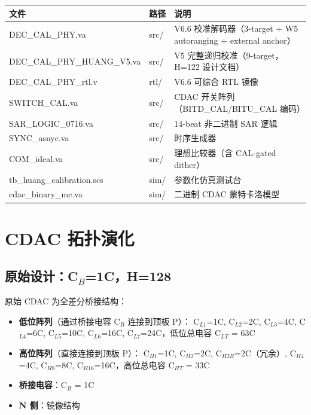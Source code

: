 \documentclass[UTF8,a4paper,12pt]{ctexart}
\theoremstyle{definition}
\begin{document}
\begin{longtable}{p{4.5cm}p{3cm}p{7cm}}
\toprule
\textbf{文件} & \textbf{路径} & \textbf{说明} \\
\midrule
\endhead
\bottomrule
\endfoot
DEC\_CAL\_PHY.va & src/ & V6.6 校准解码器（3-target + W5 autoranging + external anchor） \\
DEC\_CAL\_PHY\_HUANG\_V5.va & src/ & V5 完整递归校准（9-target，H=122 设计文档） \\
DEC\_CAL\_PHY\_rtl.v & rtl/ & V6.6 可综合 RTL 镜像 \\
SWITCH\_CAL.va & src/ & CDAC 开关阵列（BITD\_CAL/BITU\_CAL 编码） \\
SAR\_LOGIC\_0716.va & src/ & 14-beat 非二进制 SAR 逻辑 \\
SYNC\_asnyc.va & src/ & 时序生成器 \\
COM\_ideal.va & src/ & 理想比较器（含 CAL-gated dither） \\
tb\_huang\_calibration.scs & sim/ & 参数化仿真测试台 \\
cdac\_binary\_mc.va & sim/ & 二进制 CDAC 蒙特卡洛模型 \\
\bottomrule
\end{longtable}

\section{CDAC 拓扑演化}

\subsection{原始设计：C$_B$=1C，H=128}

原始 CDAC 为全差分桥接结构：

\begin{itemize}
  \item \textbf{低位阵列}（通过桥接电容 C$_B$ 连接到顶板 P）：
    C$_{L1}$=1C, C$_{L2}$=2C, C$_{L3}$=4C, C$_{L4}$=6C, C$_{L5}$=10C,
    C$_{L6}$=16C, C$_{L7}$=24C，低位总电容 C$_{LT}$ = 63C
  \item \textbf{高位阵列}（直接连接到顶板 P）：
    C$_{H1}$=1C, C$_{H2}$=2C, C$_{H2R}$=2C（冗余）, C$_{H4}$=4C,
    C$_{H8}$=8C, C$_{H16}$=16C，高位总电容 C$_{HT}$ = 33C
  \item \textbf{桥接电容}：C$_B$ = 1C
  \item \textbf{N 侧}：镜像结构
\end{itemize}
\end{document}
